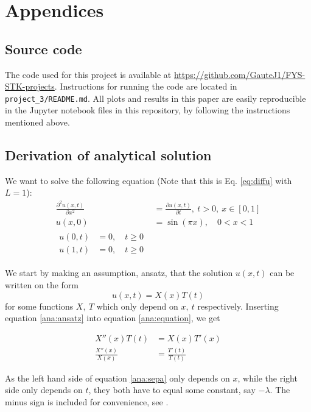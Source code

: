 \section{Appendices}
\subsection{Source code}

The code used for this project is available at \url{https://github.com/GauteJ1/FYS-STK-projects}. Instructions for running the code are located in \texttt{project\_3/README.md}.
All plots and results in this paper are easily reproducible in the Jupyter notebook files in this repository, by following the instructions mentioned above.

\subsection{Derivation of analytical solution}\label{appendixB}

We want to solve the following equation (Note that this is Eq. \ref{eq:diffu} with $L=1$):
\begin{align}\label{ana:equation}
\frac{\partial^2 u(x,t)}{\partial x^2}  &=\frac{\partial u(x,t)}{\partial t}, \ t>0, \ x\in [0, 1] \\
\label{ana:init}
u(x, 0) &= \sin(\pi x), \quad 0 < x < 1 \\
\begin{split}
\label{ana:bound}
    u(0,t) &= 0, \quad t\geq 0 \\
    u(1,t) &= 0, \quad t\geq 0
\end{split}
\end{align}

We start by making an assumption, ansatz, that the solution $u(x,t)$ can be written on the form
\begin{equation}\label{ana:ansatz}
u(x,t) = X(x)T(t)
\end{equation}
for some functions $X,\ T$ which only depend on $x,\ t$ respectively.
Inserting equation \ref{ana:ansatz} into equation \ref{ana:equation}, we get

\begin{align}
    X''(x)T(t) &= X(x) T'(x) \nonumber \\
    \frac{X''(x)}{X(x)} &= \frac{T'(t)}{T(t)} \label{ana:sepa}
\end{align}

As the left hand side of equation \ref{ana:sepa} only depends on $x$, while the right side only depends on $t$, they both have to equal some constant, say $-\lambda$. The minus sign is included for convenience, see \textcite[p. 90]{tveitoPDE}.

